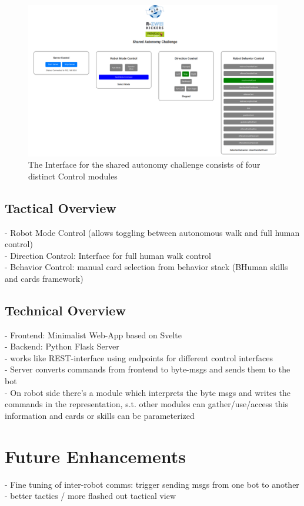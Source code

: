 \documentclass[a4paper]{article}
\begin{document}
	\begin{figure}[h]
		\centering
		\includegraphics[width=\textwidth]{img/SAC}
		\caption{The Interface for the shared autonomy challenge consists of four distinct Control modules}
	\end{figure}
	
	\subsection{Tactical Overview}
	
	- Robot Mode Control (allows toggling between autonomous walk and full human control)\\
	- Direction Control: Interface for full human walk control\\
	- Behavior Control: manual card selection from behavior stack (BHuman skills and cards framework)\\
	
	\subsection{Technical Overview}
	
	- Frontend: Minimalist Web-App based on Svelte\\
	- Backend: Python Flask Server\\
	- works like REST-interface using endpoints for different control interfaces\\
	- Server converts commands from frontend to byte-msgs and sends them to the bot\\
	- On robot side there's a module which interprets the byte msgs and writes the commands in the representation, s.t. other modules can gather/use/access this information and cards or skills can be parameterized
	
	\section{Future Enhancements}
	
	- Fine tuning of inter-robot comms: trigger sending msgs from one bot to another\\
	- better tactics / more flashed out tactical view
	
	
\end{document}
